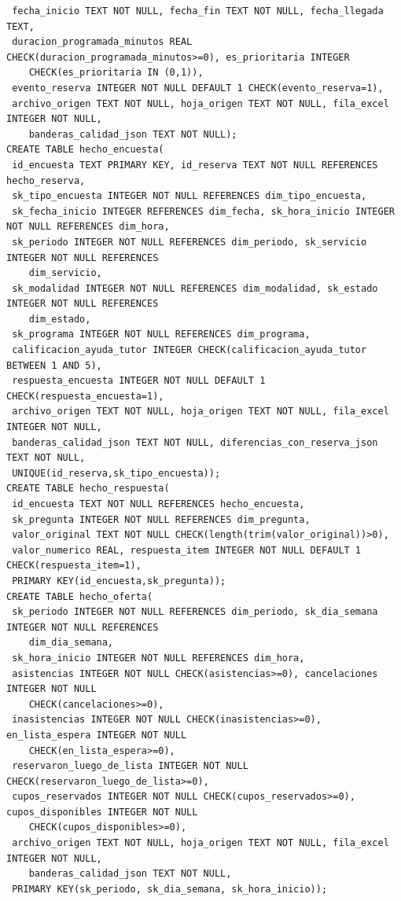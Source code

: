 \documentclass[11pt,letterpaper]{article}
\begin{document}
\begin{verbatim}
 fecha_inicio TEXT NOT NULL, fecha_fin TEXT NOT NULL, fecha_llegada TEXT,
 duracion_programada_minutos REAL CHECK(duracion_programada_minutos>=0), es_prioritaria INTEGER 
    CHECK(es_prioritaria IN (0,1)),
 evento_reserva INTEGER NOT NULL DEFAULT 1 CHECK(evento_reserva=1),
 archivo_origen TEXT NOT NULL, hoja_origen TEXT NOT NULL, fila_excel INTEGER NOT NULL, 
    banderas_calidad_json TEXT NOT NULL);
CREATE TABLE hecho_encuesta(
 id_encuesta TEXT PRIMARY KEY, id_reserva TEXT NOT NULL REFERENCES hecho_reserva,
 sk_tipo_encuesta INTEGER NOT NULL REFERENCES dim_tipo_encuesta,
 sk_fecha_inicio INTEGER REFERENCES dim_fecha, sk_hora_inicio INTEGER NOT NULL REFERENCES dim_hora,
 sk_periodo INTEGER NOT NULL REFERENCES dim_periodo, sk_servicio INTEGER NOT NULL REFERENCES 
    dim_servicio,
 sk_modalidad INTEGER NOT NULL REFERENCES dim_modalidad, sk_estado INTEGER NOT NULL REFERENCES 
    dim_estado,
 sk_programa INTEGER NOT NULL REFERENCES dim_programa,
 calificacion_ayuda_tutor INTEGER CHECK(calificacion_ayuda_tutor BETWEEN 1 AND 5),
 respuesta_encuesta INTEGER NOT NULL DEFAULT 1 CHECK(respuesta_encuesta=1),
 archivo_origen TEXT NOT NULL, hoja_origen TEXT NOT NULL, fila_excel INTEGER NOT NULL,
 banderas_calidad_json TEXT NOT NULL, diferencias_con_reserva_json TEXT NOT NULL,
 UNIQUE(id_reserva,sk_tipo_encuesta));
CREATE TABLE hecho_respuesta(
 id_encuesta TEXT NOT NULL REFERENCES hecho_encuesta,
 sk_pregunta INTEGER NOT NULL REFERENCES dim_pregunta,
 valor_original TEXT NOT NULL CHECK(length(trim(valor_original))>0),
 valor_numerico REAL, respuesta_item INTEGER NOT NULL DEFAULT 1 CHECK(respuesta_item=1),
 PRIMARY KEY(id_encuesta,sk_pregunta));
CREATE TABLE hecho_oferta(
 sk_periodo INTEGER NOT NULL REFERENCES dim_periodo, sk_dia_semana INTEGER NOT NULL REFERENCES 
    dim_dia_semana,
 sk_hora_inicio INTEGER NOT NULL REFERENCES dim_hora,
 asistencias INTEGER NOT NULL CHECK(asistencias>=0), cancelaciones INTEGER NOT NULL 
    CHECK(cancelaciones>=0),
 inasistencias INTEGER NOT NULL CHECK(inasistencias>=0), en_lista_espera INTEGER NOT NULL 
    CHECK(en_lista_espera>=0),
 reservaron_luego_de_lista INTEGER NOT NULL CHECK(reservaron_luego_de_lista>=0),
 cupos_reservados INTEGER NOT NULL CHECK(cupos_reservados>=0), cupos_disponibles INTEGER NOT NULL 
    CHECK(cupos_disponibles>=0),
 archivo_origen TEXT NOT NULL, hoja_origen TEXT NOT NULL, fila_excel INTEGER NOT NULL, 
    banderas_calidad_json TEXT NOT NULL,
 PRIMARY KEY(sk_periodo, sk_dia_semana, sk_hora_inicio));
\end{verbatim}\endgroup
\end{document}
